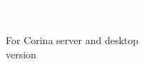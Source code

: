 
\cleardoublepage
\thispagestyle{empty} 
\includegraphics{Images/pixel.png}

\newpage
\thispagestyle{empty} 
\includegraphics{Images/pixel.png}\\[187mm] 
\vfill
{
\large For Corina server and desktop\\
version \versionnumber\\[4mm]
}
